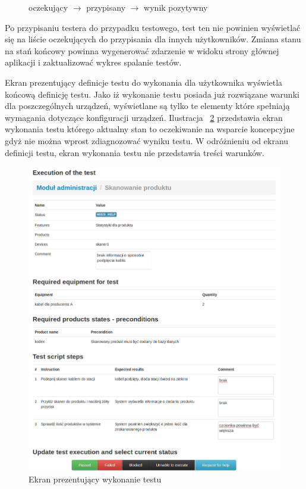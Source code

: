\begin{figure}[h!]
  \begin{center}
   oczekujący $\rightarrow$  przypisany $\rightarrow$ wynik pozytywny 
  \end{center}
  \label{diag:przejscie}
\end{figure}

Po przypisaniu testera do przypadku testowego, test ten nie powinien wyświetlać się na liście oczekujących do przypisania dla innych użytkowników. Zmiana stanu na stań końcowy powinna wygenerować zdarzenie w widoku strony głównej aplikacji i zaktualizować wykres spalanie testów.

Ekran prezentujący definicje testu do wykonania dla użytkownika wyświetla końcową definicję testu. Jako iż wykonanie testu posiada już rozwiązane warunki dla poszczególnych urządzeń, wyświetlane są tylko te elementy które spełniają wymagania dotyczące konfiguracji urządzeń. Ilustracja  ~\ref{fig:wykonanieTestu} przedstawia ekran wykonania testu którego aktualny stan to oczekiwanie na wsparcie koncepcyjne gdyż nie można wprost zdiagnozować wyniku testu. W odróżnieniu od ekranu definicji testu, ekran wykonania testu nie przedstawia treści warunków.

 \begin{figure}[here]
  \begin{center}
    \includegraphics[scale=0.4]{img/screen/wykonanieTestu.png}
    
    \caption{Ekran prezentujący wykonanie testu}
    \label{fig:wykonanieTestu}
  \end{center}
\end{figure}





